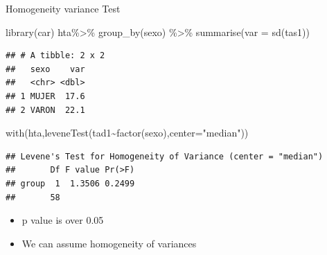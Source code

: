\documentclass[
  ignorenonframetext,
]{beamer}
\newenvironment{Shaded}{\begin{snugshade}}{\end{snugshade}}
\newcommand{\AttributeTok}[1]{\textcolor[rgb]{0.77,0.63,0.00}{#1}}
\newcommand{\FunctionTok}[1]{\textcolor[rgb]{0.00,0.00,0.00}{#1}}
\newcommand{\NormalTok}[1]{#1}
\newcommand{\SpecialCharTok}[1]{\textcolor[rgb]{0.00,0.00,0.00}{#1}}
\newcommand{\StringTok}[1]{\textcolor[rgb]{0.31,0.60,0.02}{#1}}
\providecommand{\tightlist}{%
  \setlength{\itemsep}{0pt}\setlength{\parskip}{0pt}}
\begin{document}
\begin{frame}[fragile]{Homogeneity variance Test}
\protect\hypertarget{homogeneity-variance-test}{}
\small

\begin{Shaded}
\begin{Highlighting}[]
\FunctionTok{library}\NormalTok{(car)}
\NormalTok{hta}\SpecialCharTok{\%\textgreater{}\%} 
  \FunctionTok{group\_by}\NormalTok{(sexo) }\SpecialCharTok{\%\textgreater{}\%} 
  \FunctionTok{summarise}\NormalTok{(}\AttributeTok{var =} \FunctionTok{sd}\NormalTok{(tas1)) }
\end{Highlighting}
\end{Shaded}

\begin{verbatim}
## # A tibble: 2 x 2
##   sexo    var
##   <chr> <dbl>
## 1 MUJER  17.6
## 2 VARON  22.1
\end{verbatim}

\begin{Shaded}
\begin{Highlighting}[]
\FunctionTok{with}\NormalTok{(hta,}\FunctionTok{leveneTest}\NormalTok{(tad1}\SpecialCharTok{\textasciitilde{}}\FunctionTok{factor}\NormalTok{(sexo),}\AttributeTok{center=}\StringTok{"median"}\NormalTok{))}
\end{Highlighting}
\end{Shaded}

\begin{verbatim}
## Levene's Test for Homogeneity of Variance (center = "median")
##       Df F value Pr(>F)
## group  1  1.3506 0.2499
##       58
\end{verbatim}

\begin{itemize}
\tightlist
\item
  p value is over 0.05
\item
  We can assume homogeneity of variances
\end{itemize}
\end{frame}
\end{document}
